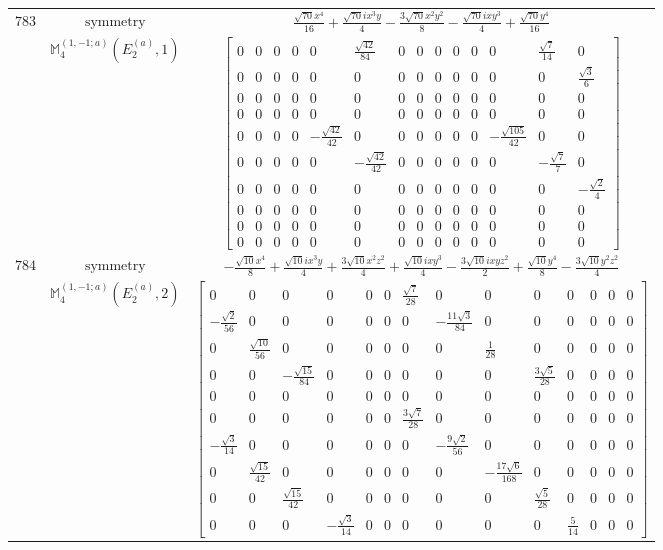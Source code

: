 \documentclass[fleqn,8pt,landscape]{jsarticle}
\begin{document}
\begin{longtable}{ccc}
$ 783 $ & $ \text{symmetry} $ & $ \frac{\sqrt{70} x^{4}}{16} + \frac{\sqrt{70} i x^{3} y}{4} - \frac{3 \sqrt{70} x^{2} y^{2}}{8} - \frac{\sqrt{70} i x y^{3}}{4} + \frac{\sqrt{70} y^{4}}{16} $ \\
$  $ & $ \mathbb{M}_{4}^{(1,-1;a)}(E_{2}^{(a)},1) $ & $ \begin{bmatrix} 0 & 0 & 0 & 0 & 0 & \frac{\sqrt{42}}{84} & 0 & 0 & 0 & 0 & 0 & 0 & \frac{\sqrt{7}}{14} & 0 \\ 0 & 0 & 0 & 0 & 0 & 0 & 0 & 0 & 0 & 0 & 0 & 0 & 0 & \frac{\sqrt{3}}{6} \\ 0 & 0 & 0 & 0 & 0 & 0 & 0 & 0 & 0 & 0 & 0 & 0 & 0 & 0 \\ 0 & 0 & 0 & 0 & 0 & 0 & 0 & 0 & 0 & 0 & 0 & 0 & 0 & 0 \\ 0 & 0 & 0 & 0 & - \frac{\sqrt{42}}{42} & 0 & 0 & 0 & 0 & 0 & 0 & - \frac{\sqrt{105}}{42} & 0 & 0 \\ 0 & 0 & 0 & 0 & 0 & - \frac{\sqrt{42}}{42} & 0 & 0 & 0 & 0 & 0 & 0 & - \frac{\sqrt{7}}{7} & 0 \\ 0 & 0 & 0 & 0 & 0 & 0 & 0 & 0 & 0 & 0 & 0 & 0 & 0 & - \frac{\sqrt{2}}{4} \\ 0 & 0 & 0 & 0 & 0 & 0 & 0 & 0 & 0 & 0 & 0 & 0 & 0 & 0 \\ 0 & 0 & 0 & 0 & 0 & 0 & 0 & 0 & 0 & 0 & 0 & 0 & 0 & 0 \\ 0 & 0 & 0 & 0 & 0 & 0 & 0 & 0 & 0 & 0 & 0 & 0 & 0 & 0 \end{bmatrix} $ \\ \hline
$ 784 $ & $ \text{symmetry} $ & $ - \frac{\sqrt{10} x^{4}}{8} + \frac{\sqrt{10} i x^{3} y}{4} + \frac{3 \sqrt{10} x^{2} z^{2}}{4} + \frac{\sqrt{10} i x y^{3}}{4} - \frac{3 \sqrt{10} i x y z^{2}}{2} + \frac{\sqrt{10} y^{4}}{8} - \frac{3 \sqrt{10} y^{2} z^{2}}{4} $ \\
$  $ & $ \mathbb{M}_{4}^{(1,-1;a)}(E_{2}^{(a)},2) $ & $ \begin{bmatrix} 0 & 0 & 0 & 0 & 0 & 0 & \frac{\sqrt{7}}{28} & 0 & 0 & 0 & 0 & 0 & 0 & 0 \\ - \frac{\sqrt{2}}{56} & 0 & 0 & 0 & 0 & 0 & 0 & - \frac{11 \sqrt{3}}{84} & 0 & 0 & 0 & 0 & 0 & 0 \\ 0 & \frac{\sqrt{10}}{56} & 0 & 0 & 0 & 0 & 0 & 0 & \frac{1}{28} & 0 & 0 & 0 & 0 & 0 \\ 0 & 0 & - \frac{\sqrt{15}}{84} & 0 & 0 & 0 & 0 & 0 & 0 & \frac{3 \sqrt{5}}{28} & 0 & 0 & 0 & 0 \\ 0 & 0 & 0 & 0 & 0 & 0 & 0 & 0 & 0 & 0 & 0 & 0 & 0 & 0 \\ 0 & 0 & 0 & 0 & 0 & 0 & \frac{3 \sqrt{7}}{28} & 0 & 0 & 0 & 0 & 0 & 0 & 0 \\ - \frac{\sqrt{3}}{14} & 0 & 0 & 0 & 0 & 0 & 0 & - \frac{9 \sqrt{2}}{56} & 0 & 0 & 0 & 0 & 0 & 0 \\ 0 & \frac{\sqrt{15}}{42} & 0 & 0 & 0 & 0 & 0 & 0 & - \frac{17 \sqrt{6}}{168} & 0 & 0 & 0 & 0 & 0 \\ 0 & 0 & \frac{\sqrt{15}}{42} & 0 & 0 & 0 & 0 & 0 & 0 & \frac{\sqrt{5}}{28} & 0 & 0 & 0 & 0 \\ 0 & 0 & 0 & - \frac{\sqrt{3}}{14} & 0 & 0 & 0 & 0 & 0 & 0 & \frac{5}{14} & 0 & 0 & 0 \end{bmatrix} $ \\ \hline

\end{longtable}
\end{document}
